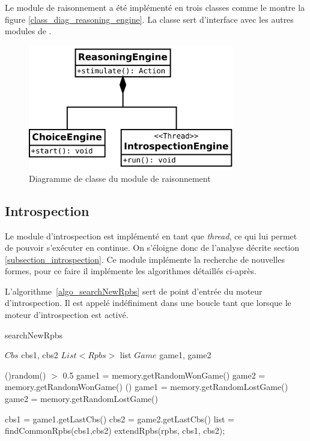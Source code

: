 
Le module de raisonnement a été implémenté en trois classes comme le montre la figure \vref{class_diag_reasoning_engine}. La classe  sert d'interface avec les autres modules de \cogito{}. 

\begin{figure}[H] 
\center
\includegraphics[width=0.8\textwidth]{files/class_diagram/reasoningEngine} 
\caption{Diagramme de classe du module de raisonnement}
\label{class_diag_reasoning_engine}
\end{figure}

\subsection{Introspection}


Le module d'introspection est implémenté en tant que \emph{thread}, ce qui lui permet de pouvoir s'exécuter en continue. On s'éloigne donc de l'analyse décrite section \vref{subsection_introspection}. Ce module implémente la recherche de nouvelles formes, pour ce faire il implémente les algorithmes détaillés ci-après.


L'algorithme~\vref{algo_searchNewRpbs} sert de point d'entrée du moteur d'introspection. Il est appelé indéfiniment dans une boucle \og tant que \fg{} lorsque le moteur d'introspection est activé.


\begin{algorithm}[H]
	\caption{searchNewRpbs}
	\label{algo_searchNewRpbs}
  \vspace{0.2cm}
  
	$Cbs$ cbs1, cbs2\;
	$List<Rpbs>$ list\;	
	$Game$ game1, game2\;
	
	\eIf(){random() $>$ 0.5}
		{
			game1 = memory.getRandomWonGame()\;
			{
				game2 = memory.getRandomWonGame()\;
			}
		}()
		{
			game1 = memory.getRandomLostGame()\;
			{
				game2 = memory.getRandomLostGame()\;
			}
		}
  \vspace{0.2cm}
  
	cbs1 = game1.getLastCbs()\;
	cbs2 = game2.getLastCbs()\;
		{ 
			list = findCommonRpbs(cbs1,cbs2)\;
			{
				extendRpbs(rpbs, cbs1, cbs2);
			}
		}
		
\end{algorithm}


